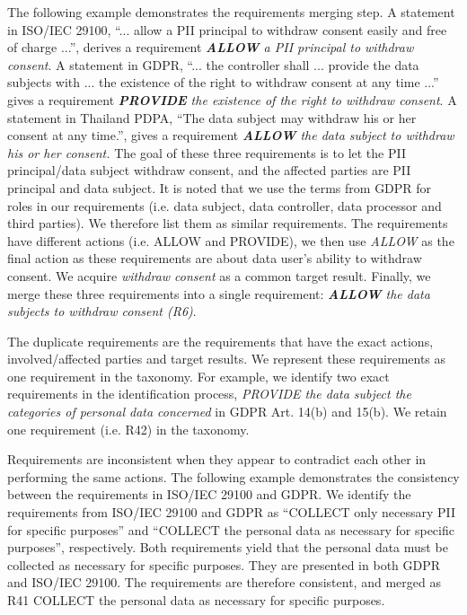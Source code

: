 The following example demonstrates the requirements merging step. A statement in ISO/IEC 29100, ``... allow a PII principal to withdraw consent easily and free of charge ...'', derives a requirement \textit{\textbf{ALLOW} a PII principal to withdraw consent}. A statement in GDPR, ``... the controller shall ... provide the data subjects with ... the existence of the right to withdraw consent at any time ...'' gives a requirement \textit{\textbf{PROVIDE} the existence of the right to withdraw consent}. A statement in Thailand PDPA, ``The data subject may withdraw his or her consent at any time.'', gives a requirement \textit{\textbf{ALLOW} the data subject to withdraw his or her consent.} The goal of these three requirements is to let the PII principal/data subject withdraw consent, and the affected parties are PII principal and data subject. It is noted that we use the terms from GDPR for roles in our requirements (i.e. data subject, data controller, data processor and third parties). We therefore list them as similar requirements. The requirements have different actions (i.e. ALLOW and PROVIDE), we then use \emph{ALLOW} as the final action as these requirements are about data user's ability to withdraw consent. We acquire \textit{withdraw consent} as a common target result. Finally, we merge these three requirements into a single requirement: \textit{\textbf{ALLOW} the data subjects to withdraw consent (R6)}.

The duplicate requirements are the requirements that have the exact actions, involved/affected parties and target results. We represent these requirements as one requirement in the taxonomy. For example, we identify two exact requirements in the identification process, \emph{PROVIDE the data subject the categories of personal data concerned} in GDPR Art. 14(b) and 15(b). We retain one requirement (i.e. R42) in the taxonomy.

Requirements are inconsistent when they appear to contradict each other in performing the same actions. The following example demonstrates the consistency between the requirements in ISO/IEC 29100 and GDPR. We identify the requirements from ISO/IEC 29100 and GDPR as ``COLLECT only necessary PII for specific purposes'' and ``COLLECT the personal data as necessary for specific purposes'', respectively. Both requirements yield that the personal data must be collected as necessary for specific purposes. They are presented in both GDPR and ISO/IEC 29100. The requirements are therefore consistent, and merged as R41 COLLECT the personal data as necessary for specific purposes.


